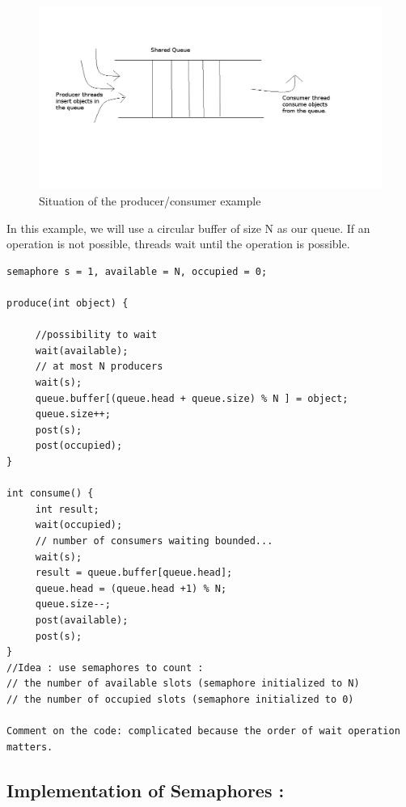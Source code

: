 \begin{figure}
  \begin{center}
    \includegraphics[scale=0.5]{shared_queue.png}
    \caption{Situation of the producer/consumer example}
    \label{}
  \end{center}
\end{figure}

In this example, we will use a circular buffer of size N as our queue.
If an operation is not possible, threads wait until the operation is possible.
\begin{verbatim}
semaphore s = 1, available = N, occupied = 0;

produce(int object) {

     //possibility to wait
     wait(available);
     // at most N producers
     wait(s);
     queue.buffer[(queue.head + queue.size) % N ] = object;
     queue.size++;
     post(s);
     post(occupied);
}

int consume() {
     int result;
     wait(occupied);
     // number of consumers waiting bounded...
     wait(s);
     result = queue.buffer[queue.head];
     queue.head = (queue.head +1) % N;
     queue.size--;
     post(available);
     post(s);
}
//Idea : use semaphores to count :
// the number of available slots (semaphore initialized to N)
// the number of occupied slots (semaphore initialized to 0)

Comment on the code: complicated because the order of wait operation matters.
\end{verbatim}



\subsection{Implementation of Semaphores :}

